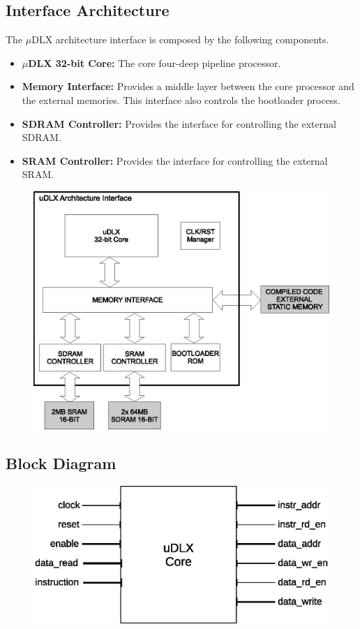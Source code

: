 \documentclass{article}
\begin{document}
  \subsection{Interface Architecture}
  The $\mu$DLX architecture interface is composed by the following components.
  \begin{itemize}
    \item \textbf{$\mu$DLX 32-bit Core:} The core four-deep pipeline processor.
    \item \textbf{Memory Interface:} Provides a middle layer between the core processor and the external memories. This interface also controls the bootloader process.
    \item \textbf{SDRAM Controller:} Provides the interface for controlling the external SDRAM.
    \item \textbf{SRAM Controller:} Provides the interface for controlling the external SRAM.
  \end{itemize}
  \begin{figure}[H]
    \centering
    \includegraphics[width=.8\linewidth]{pictures/architecture_interface.eps}
  \end{figure}

  \subsection{Block Diagram}
  \begin{figure}[H]
    \centering
    \includegraphics[width=.85\linewidth]{pictures/udlx_block.eps}
  \end{figure}
 
\end{document}
